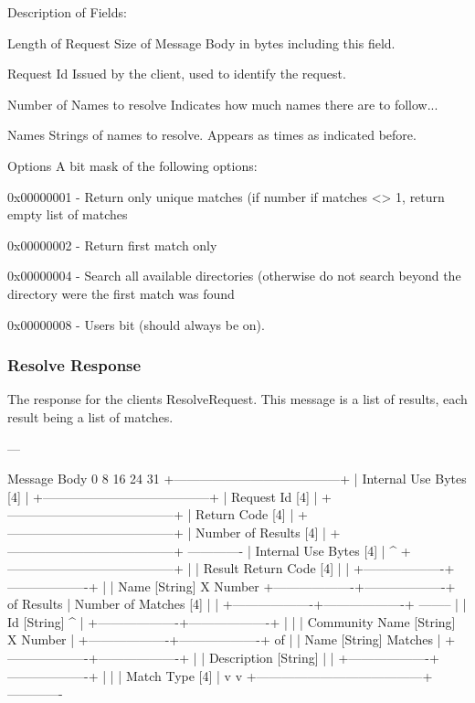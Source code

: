 \documentclass[titlepage,oneside]{book}
\begin{document}
Description of Fields:

Length of Request
  Size of Message Body in bytes including this field.

Request Id
  Issued by the client, used to identify the request.

Number of Names to resolve
  Indicates how much names there are to follow...

Names
  Strings of names to resolve. Appears as times as indicated before.

Options
  A bit mask of the following options:

    0x00000001 - Return only unique matches (if number if matches <> 1,
    return empty list of matches

    0x00000002 - Return first match only

    0x00000004 - Search all available directories (otherwise do not
    search beyond the directory were the first match was found

    0x00000008 - Users bit (should always be on).

\subsubsection{Resolve Response}

The response for the clients ResolveRequest. This message is a list of
results, each result being a list of matches.

---


Message Body
0         8         16        24      31
+---------------------------------------+
|       Internal Use Bytes [4]          |
+---------------------------------------+
|            Request Id [4]             |
+---------------------------------------+
|            Return Code [4]            |
+---------------------------------------+
|        Number of Results [4]          |
+---------------------------------------+   -------------
|       Internal Use Bytes [4]          |              ^
+---------------------------------------+              |
|        Result Return Code [4]         |              |
+-------------------+-------------------+              |
| Name [String]                                     X Number
+-------------------+-------------------+          of Results
|       Number of Matches [4]           |              |
+-------------------+-------------------+   --------   |
| Id [String]                                 ^        |
+-------------------+-------------------+     |        |
| Community Name [String]                   X Number   |
+-------------------+-------------------+     of       |
| Name [String]                             Matches    |
+-------------------+-------------------+              |
| Description [String]                        |        |
+-------------------+-------------------+     |        |
|          Match Type [4]               |     v        v
+---------------------------------------+   -------------
\end{document}
